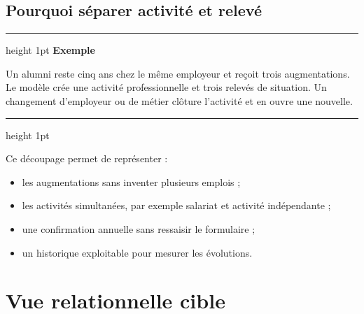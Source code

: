 \documentclass[11pt,a4paper]{article}
\newenvironment{keybox}[1]{%
  \begin{center}
  \begin{minipage}{0.95\textwidth}
  \color{Primary}\hrule height 1pt
  \vspace{2mm}
  \textbf{\color{Primary}#1}\par\smallskip
  \color{Dark}
}{%
  \par\smallskip
  \color{Primary}\hrule height 1pt
  \end{minipage}
  \end{center}
}
\begin{document}
\subsection{Pourquoi séparer activité et relevé}

\begin{keybox}{Exemple}
Un alumni reste cinq ans chez le même employeur et reçoit trois augmentations.
Le modèle crée une activité professionnelle et trois relevés de situation. Un
changement d'employeur ou de métier clôture l'activité et en ouvre une nouvelle.
\end{keybox}

Ce découpage permet de représenter :

\begin{itemize}
  \item les augmentations sans inventer plusieurs emplois ;
  \item les activités simultanées, par exemple salariat et activité indépendante ;
  \item une confirmation annuelle sans ressaisir le formulaire ;
  \item un historique exploitable pour mesurer les évolutions.
\end{itemize}

\section{Vue relationnelle cible}
\end{document}
